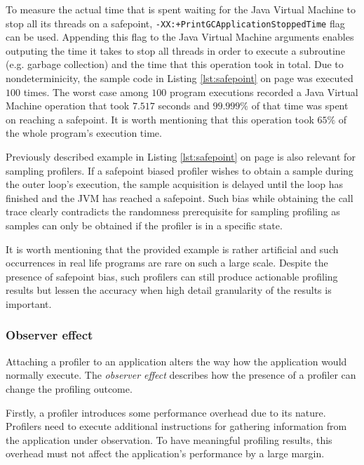 \documentclass[..thesis.tex]{subfiles}
\begin{document}
To measure the actual time that is spent waiting for the Java Virtual Machine to stop all its threads on a safepoint, \texttt{-XX:+PrintGCApplicationStoppedTime} flag can be used. Appending this flag to the Java Virtual Machine arguments enables outputing the time it takes to stop all threads in order to execute a subroutine (e.g. garbage collection) and the time that this operation took in total. Due to nondeterminicity, the sample code in Listing \ref{lst:safepoint} on page \pageref{lst:safepoint} was executed $100$ times. The worst case among $100$ program executions recorded a Java Virtual Machine operation that took $7.517$ seconds and $99.999\%$ of that time was spent on reaching a safepoint. It is worth mentioning that this operation took $65\%$ of the whole program's execution time.

Previously described example in Listing \ref{lst:safepoint} on page \pageref{lst:safepoint} is also relevant for sampling profilers. If a safepoint biased profiler wishes to obtain a sample during the outer loop's execution, the sample acquisition is delayed until the loop has finished and the JVM has reached a safepoint. Such bias while obtaining the call trace clearly contradicts the randomness prerequisite for sampling profiling as samples can only be obtained if the profiler is in a specific state. 


It is worth mentioning that the provided example is rather artificial and such occurrences in real life programs are rare on such a large scale. Despite the presence of safepoint bias, such profilers can still produce actionable profiling results but lessen the accuracy when high detail granularity of the results is important.

\subsubsection{Observer effect}

Attaching a profiler to an application alters the way how the application would normally execute. The \textit{observer effect} describes how the presence of a profiler can change the profiling outcome.
 
Firstly, a profiler introduces some performance overhead due to its nature. Profilers need to execute additional instructions for gathering information from the application under observation. To have meaningful profiling results, this overhead must not affect the application's performance by a large margin.
\end{document}
